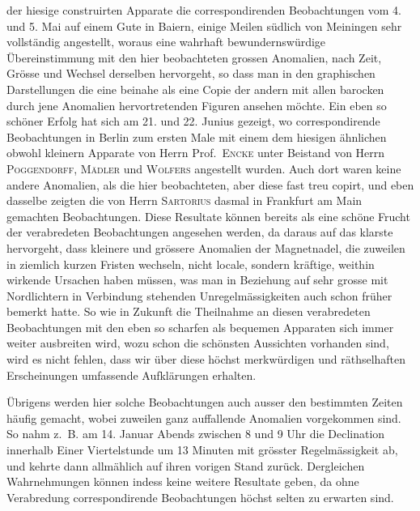 der hiesige construirten Apparate die correspondirenden Beobachtungen vom 4. und 5. Mai auf einem Gute in Baiern, einige Meilen südlich von Meiningen sehr vollständig angestellt, woraus eine wahrhaft bewundernswürdige Übereinstimmung mit den hier beobachteten grossen Anomalien, nach Zeit, Grösse und Wechsel derselben hervorgeht, so dass man in den graphischen Darstellungen die eine beinahe als eine Copie der andern mit allen barocken durch jene Anomalien hervortretenden Figuren ansehen möchte. Ein eben so schöner Erfolg hat sich am 21. und 22. Junius gezeigt, wo correspondirende Beobachtungen in Berlin zum ersten Male mit einem dem hiesigen ähnlichen obwohl kleinern Apparate von Herrn Prof.\ \textsc{Encke} unter Beistand von Herrn \textsc{Poggendorff}, \textsc{Mädler} und \textsc{Wolfers} angestellt wurden. Auch dort waren keine andere Anomalien, als die hier beobachteten, aber diese fast treu copirt, und eben dasselbe zeigten die von Herrn \textsc{Sartorius} dasmal in Frankfurt am Main gemachten Beobachtungen. Diese Resultate können bereits als eine schöne Frucht der verabredeten Beobachtungen angesehen werden, da daraus auf das klarste hervorgeht, dass kleinere und grössere Anomalien der Magnetnadel, die zuweilen in ziemlich kurzen Fristen wechseln, nicht locale, sondern kräftige, weithin wirkende Ursachen haben müssen, was man in Beziehung auf sehr grosse mit Nordlichtern in Verbindung stehenden Unregelmässigkeiten auch schon früher bemerkt hatte. So wie in Zukunft die Theilnahme an diesen verabredeten Beobachtungen mit den eben so scharfen als bequemen Apparaten sich immer weiter ausbreiten wird, wozu schon die schönsten Aussichten vorhanden sind, wird es nicht fehlen, dass wir über diese höchst merkwürdigen und räthselhaften Erscheinungen umfassende Aufklärungen erhalten.

Übrigens werden hier solche Beobachtungen auch ausser den bestimmten Zeiten häufig gemacht, wobei zuweilen ganz auffallende Anomalien vorgekommen sind. So nahm z.\ B. am 14. Januar Abends zwischen 8 und 9 Uhr die Declination innerhalb Einer Viertelstunde um 13 Minuten mit grösster Regelmässigkeit ab, und kehrte dann allmählich auf ihren vorigen Stand zurück. Dergleichen Wahrnehmungen können indess keine weitere Resultate geben, da ohne Verabredung correspondirende Beobachtungen höchst selten zu erwarten sind.

